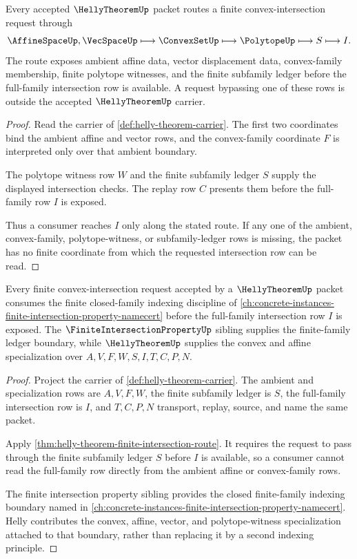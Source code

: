 \begin{theorem}\label{thm:helly-theorem-finite-intersection-route}
Every accepted $\HellyTheoremUp$ packet routes a finite convex-intersection request through
$$
\AffineSpaceUp,\VecSpaceUp \longmapsto \ConvexSetUp \longmapsto \PolytopeUp \longmapsto S \longmapsto I.
$$
The route exposes ambient affine data, vector displacement data, convex-family membership, finite polytope witnesses, and the finite subfamily ledger before the full-family intersection row is available. A request bypassing one of these rows is outside the accepted $\HellyTheoremUp$ carrier.
\end{theorem}
\begin{proof}
Read the carrier of \autoref{def:helly-theorem-carrier}. The first two coordinates bind the ambient affine and vector rows, and the convex-family coordinate $F$ is interpreted only over that ambient boundary.

The polytope witness row $W$ and the finite subfamily ledger $S$ supply the displayed intersection checks. The replay row $C$ presents them before the full-family row $I$ is exposed.

Thus a consumer reaches $I$ only along the stated route. If any one of the ambient, convex-family, polytope-witness, or subfamily-ledger rows is missing, the packet has no finite coordinate from which the requested intersection row can be read.
\end{proof}

\begin{theorem}\label{thm:helly-theorem-finite-intersection-forward-link}
Every finite convex-intersection request accepted by a $\HellyTheoremUp$ packet consumes the finite closed-family indexing discipline of \autoref{ch:concrete-instances-finite-intersection-property-namecert} before the full-family intersection row $I$ is exposed. The $\FiniteIntersectionPropertyUp$ sibling supplies the finite-family ledger boundary, while $\HellyTheoremUp$ supplies the convex and affine specialization over $A,V,F,W,S,I,T,C,P,N$.
\end{theorem}
\begin{proof}
Project the carrier of \autoref{def:helly-theorem-carrier}. The ambient and specialization rows are $A,V,F,W$, the finite subfamily ledger is $S$, the full-family intersection row is $I$, and $T,C,P,N$ transport, replay, source, and name the same packet.

Apply \autoref{thm:helly-theorem-finite-intersection-route}. It requires the request to pass through the finite subfamily ledger $S$ before $I$ is available, so a consumer cannot read the full-family row directly from the ambient affine or convex-family rows.

The finite intersection property sibling provides the closed finite-family indexing boundary named in \autoref{ch:concrete-instances-finite-intersection-property-namecert}. Helly contributes the convex, affine, vector, and polytope-witness specialization attached to that boundary, rather than replacing it by a second indexing principle.
\end{proof}

